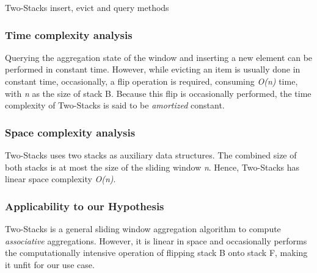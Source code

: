 \begin{algorithm}
    \caption[Two-Stacks]{Two-Stacks insert, evict and query methods}
    \label{pseudo:2-stacks}
    \begin{algorithmic}[1]
            \State \Return{$\overline{\theta}$} 
        \Else 
            \State {} 
        \EndIf
        \EndFunction
        
            \State {}
        \EndFunction
        
        
        \EndFunction
        
        
             
                \EndWhile
            \EndIf
        \EndFunction
    \end{algorithmic}
\end{algorithm}

\subsubsection*{Time complexity analysis}
Querying the aggregation state of the window and inserting a new element can be performed in constant time. However, while evicting an item is usually done in constant time, occasionally, a flip operation is required, consuming \textit{O(n)} time, with \textit{n} as the size of stack B. Because this flip is occasionally performed, the time complexity of Two-Stacks is said to be \textit{amortized} constant.

\subsubsection*{Space complexity analysis}
Two-Stacks uses two stacks as auxiliary data structures. The combined size of both stacks is at most the size of the sliding window \textit{n}. Hence, Two-Stacks has linear space complexity \textit{O(n)}.

\subsubsection*{Applicability to our Hypothesis}
Two-Stacks is a general sliding window aggregation algorithm to compute \textit{associative} aggregations. However, it is linear in space and occasionally performs the computationally intensive operation of flipping stack B onto stack F, making it unfit for our use case.



